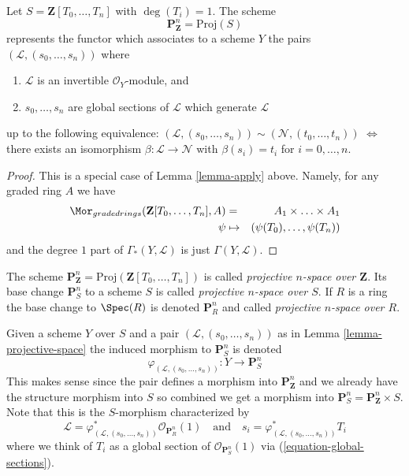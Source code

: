 \begin{lemma}
\label{lemma-projective-space}
Let $S = \mathbf{Z}[T_0, \ldots, T_n]$ with $\deg(T_i) = 1$.
The scheme
$$
\mathbf{P}^n_{\mathbf{Z}} = \text{Proj}(S)
$$
represents the functor which associates to a scheme $Y$ the pairs
$(\mathcal{L}, (s_0, \ldots, s_n))$ where
\begin{enumerate}
\item $\mathcal{L}$ is an invertible $\mathcal{O}_Y$-module, and
\item $s_0, \ldots, s_n$ are global sections of $\mathcal{L}$
which generate $\mathcal{L}$
\end{enumerate}
up to the following equivalence:
$(\mathcal{L}, (s_0, \ldots, s_n)) \sim
(\mathcal{N}, (t_0, \ldots, t_n))$ $\Leftrightarrow$ there exists
an isomorphism $\beta : \mathcal{L} \to \mathcal{N}$
with $\beta(s_i) = t_i$ for $i = 0, \ldots, n$.
\end{lemma}

\begin{proof}
This is a special case of Lemma \ref{lemma-apply} above.
Namely, for any graded ring $A$ we have
\begin{eqnarray*}
\Mor_{graded rings}(\mathbf{Z}[T_0, \ldots, T_n], A)
& = &
A_1 \times \ldots \times A_1 \\
\psi & \mapsto & (\psi(T_0), \ldots, \psi(T_n))
\end{eqnarray*}
and the degree $1$ part of $\Gamma_*(Y, \mathcal{L})$ is
just $\Gamma(Y, \mathcal{L})$.
\end{proof}

\begin{definition}
\label{definition-projective-space}
The scheme
$\mathbf{P}^n_{\mathbf{Z}} = \text{Proj}(\mathbf{Z}[T_0, \ldots, T_n])$
is called {\it projective $n$-space over $\mathbf{Z}$}.
Its base change $\mathbf{P}^n_S$ to a scheme $S$ is called
{\it projective $n$-space over $S$}. If $R$ is a ring the base change
to $\Spec(R)$ is denoted $\mathbf{P}^n_R$ and called
{\it projective $n$-space over $R$}.
\end{definition}

\noindent
Given a scheme $Y$ over $S$
and a pair $(\mathcal{L}, (s_0, \ldots, s_n))$ as in
Lemma \ref{lemma-projective-space}
the induced morphism to $\mathbf{P}^n_S$ is denoted
$$
\varphi_{(\mathcal{L}, (s_0, \ldots, s_n))} :
Y \longrightarrow \mathbf{P}^n_S
$$
This makes sense since the pair defines a morphism into
$\mathbf{P}^n_{\mathbf{Z}}$ and we already have the structure
morphism into $S$ so combined we get a morphism into
$\mathbf{P}^n_S = \mathbf{P}^n_{\mathbf{Z}} \times S$.
Note that this is the $S$-morphism characterized by
$$
\mathcal{L} =
\varphi_{(\mathcal{L}, (s_0, \ldots, s_n))}^*\mathcal{O}_{\mathbf{P}^n_R}(1)
\quad
\text{and}
\quad
s_i = \varphi_{(\mathcal{L}, (s_0, \ldots, s_n))}^*T_i
$$
where we think of $T_i$ as a global section of
$\mathcal{O}_{\mathbf{P}^n_S}(1)$ via (\ref{equation-global-sections}).

